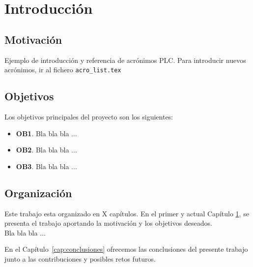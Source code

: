 \chapter{Introducción}\label{cap:introduccion}

\minitoc

\section{Motivación}

Ejemplo de introducción y referencia de acrónimos \ac{PLC}. Para introducir nuevos acrónimos, ir al fichero \texttt{acro\_list.tex}

\section{Objetivos}\label{sec:objetivos}

Los objetivos principales del proyecto son los siguientes:

\begin{itemize}
    \item \textbf{OB1}. Bla bla bla ...
    \item \textbf{OB2}. Bla bla bla ...
    \item \textbf{OB3}. Bla bla bla ...
\end{itemize}


\section{Organización}

Este trabajo esta organizado en X capítulos. En el primer y actual Capítulo \ref{cap:introduccion}, se presenta el trabajo aportando la motivación y los objetivos deseados.\\

Bla bla bla ...

En el Capítulo~\ref{cap:conclusiones} ofrecemos las conclusiones del presente trabajo junto a las contribuciones y posibles retos futuros.